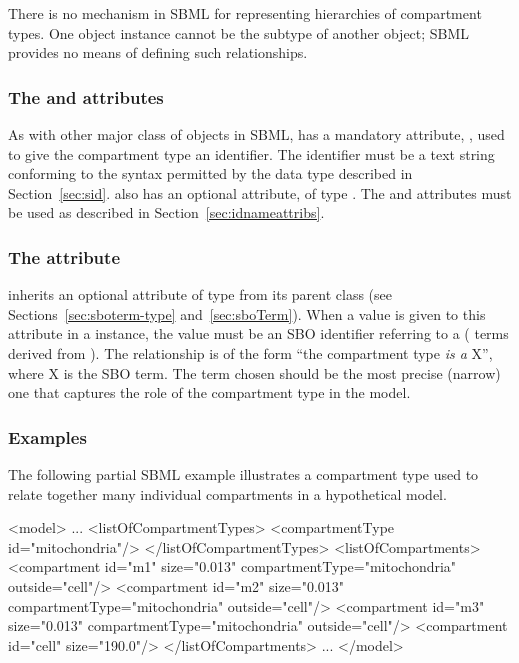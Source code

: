 There is no mechanism in SBML for representing hierarchies of
compartment types.  One \CompartmentType object instance cannot be the
subtype of another \CompartmentType object; SBML provides no
means of defining such relationships.


\subsubsection{The  and  attributes}

As with other major class of objects in SBML, \CompartmentType has a
mandatory attribute, , used to give the compartment type an
identifier.  The identifier must be a text string conforming to
the syntax permitted by the  data type described in
Section~\ref{sec:sid}.  \CompartmentType also has an optional
 attribute, of type .  The 
and  attributes must be used as described in
Section~\ref{sec:idnameattribs}.


\subsubsection{The  attribute}
\label{sec:compartmenttype-sboterm}

\CompartmentType inherits an optional 
attribute of type  from its parent
class \SBase (see Sections~\ref{sec:sboterm-type}
and~\ref{sec:sboTerm}).  When a value is given to this
attribute in a \CompartmentType instance, the value must
be an SBO identifier referring to a  (\ie
terms derived from \sboparticipantphysical).  The relationship is
of the form ``the compartment type \emph{is a} X'', where X is the
SBO term.  The term chosen should be the most precise (narrow) one
that captures the role of the compartment type in the model.


\subsubsection{Examples}

The following partial SBML example illustrates a compartment type
used to relate together many individual compartments in a
hypothetical model.

\begin{example}
<model>
    ...
    <listOfCompartmentTypes>
        <compartmentType id="mitochondria"/>
    </listOfCompartmentTypes>
    <listOfCompartments>
        <compartment id="m1" size="0.013" compartmentType="mitochondria" outside="cell"/>
        <compartment id="m2" size="0.013" compartmentType="mitochondria" outside="cell"/>
        <compartment id="m3" size="0.013" compartmentType="mitochondria" outside="cell"/>
        <compartment id="cell" size="190.0"/>
    </listOfCompartments>
    ...
</model>
\end{example}



